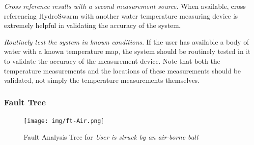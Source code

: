 \documentclass[11pt]{article}
\begin{document}
\textit{Cross reference results with a second measurement source.} When available, cross referencing
HydroSwarm with another water temperature measuring device is extremely helpful in validating
the accuracy of the system.


\textit{Routinely test the system in known conditions.} If the user has available a body of water
with a known temperature map, the system should be routinely tested in it to validate the
accuracy of the measurement device. Note that both the temperature measurements and the locations
of these measurements should be validated, not simply the temperature measurements themselves.
\subsubsection*{Fault Tree}
\begin{figure}[H]
   \centering
   \texttt{[image: img/ft-Air.png]} %
   \caption{Fault Analysis Tree for \textit{User is struck by an air-borne ball}}
   \label{fig:ft-Air}
\end{figure}
\end{document}
